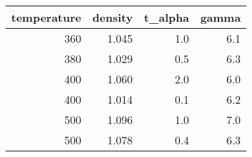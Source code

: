 \begin{tabular}{rrrr}
\toprule
 temperature &  density &  t_alpha &  gamma \\
\midrule
         360 &    1.045 &      1.0 &    6.1 \\
         380 &    1.029 &      0.5 &    6.3 \\
         400 &    1.060 &      2.0 &    6.0 \\
         400 &    1.014 &      0.1 &    6.2 \\
         500 &    1.096 &      1.0 &    7.0 \\
         500 &    1.078 &      0.4 &    6.3 \\
\bottomrule
\end{tabular}
